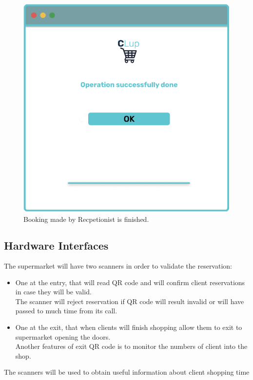 \begin{figure}[H]
  \caption{Booking made by Recpetionist is finished.}
  \label{fig:Login}
  \centering
  \includegraphics[scale=0.35]{images/mockup/Done_Rec.png}

\end{figure}



\subsection{Hardware Interfaces}
The supermarket will have two scanners in order to validate the reservation:

\par \medskip 
\begin{itemize}
\item	One at the entry, that will read QR code and will confirm client reservations in case they will be valid. \\
The scanner will reject reservation if QR code will result invalid or will have passed to much time from its call.
\item One at the exit, that when clients will finish shopping allow them to exit to supermarket opening the doors. \\
Another features of exit QR code is to monitor the numbers of client into the shop.
\end{itemize} 
\par \medskip 
The scanners will be used to obtain useful information about client shopping time
